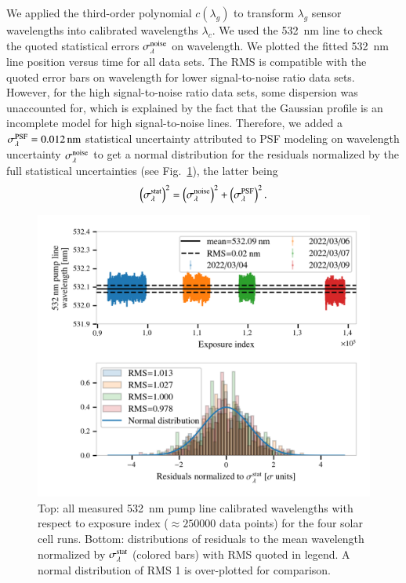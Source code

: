 We applied the third-order polynomial $c(\lambda_g)$ to transform $\lambda_g$ sensor wavelengths into calibrated wavelengths $\lambda_c$. We used the \SI{532}{\nm} line to check the quoted statistical errors $\sigma_\lambda^{\rm noise}$ on wavelength. We plotted the fitted \SI{532}{\nm} line position versus time for all data sets. The RMS is compatible with the quoted error bars on wavelength for lower signal-to-noise ratio data sets. However, for the high signal-to-noise ratio data sets, some dispersion was unaccounted for, which is explained by the fact that the Gaussian profile is an incomplete model for high signal-to-noise lines. Therefore, we added a $\sigma_\lambda^{\rm PSF}=\SI{0.012}{\nm}$ statistical uncertainty attributed to PSF modeling on wavelength uncertainty $\sigma_{\lambda}^{\rm noise}$ to get a normal distribution for the residuals normalized by the full statistical uncertainties (see Fig.~\ref{fig:wavelength_error_model_consistency}), the latter being
\begin{equation}
    \left(\sigma_{\lambda}^{\rm stat}\right)^2 =  \left(\sigma_{\lambda}^{\rm noise}\right)^2 +  \left(\sigma_{\lambda}^{\rm PSF}\right)^2.
\end{equation}

\begin{figure}%
\centering
\includegraphics[width=\columnwidth]{fig/wavelength_error_model_consistency.png}
\caption{Top: all measured \SI{532}{\nm} pump line calibrated wavelengths with respect to exposure index ($\approx\num{250000}$ data points) for the four solar cell runs. Bottom: distributions of residuals to the mean wavelength normalized by $\sigma_{\lambda}^{\rm stat}$ (colored bars) with RMS quoted in legend. A normal distribution of RMS 1 is over-plotted for comparison.}\label{fig:wavelength_error_model_consistency}
\end{figure}

